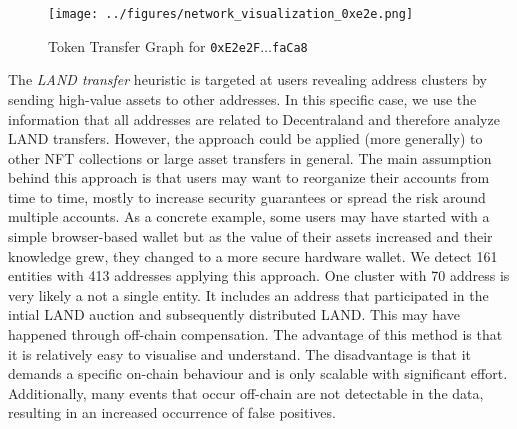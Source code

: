 \documentclass[12pt,a4paper,titlepage,oneside,english]{article}
\begin{document}
\begin{figure}[h!]
	\centering
	\texttt{[image: ../figures/network\_visualization\_0xe2e.png]}
	\caption{Token Transfer Graph for \texttt{0xE2e2F$\dots$faCa8}}
	\label{fig:cluster}
\end{figure}

The \textit{LAND transfer} heuristic is targeted at users revealing address clusters by sending high-value assets to other addresses. In this specific case, we use the information that all addresses are related to Decentraland and therefore analyze LAND transfers. However, the approach could be applied (more generally) to other NFT collections or large asset transfers in general. \newline
The main assumption behind this approach is that users may want to reorganize their accounts from time to time, mostly to increase security guarantees or spread the risk around multiple accounts. As a concrete example, some users may have started with a simple browser-based wallet but as the value of their assets increased and their knowledge grew, they changed to a more secure hardware wallet. We detect 161 entities with 413 addresses applying this approach. One cluster with 70 address is very likely a not a single entity. It includes an address that participated in the intial LAND auction and subsequently distributed LAND. This may have happened through off-chain compensation. The advantage of this method is that it is relatively easy to visualise and understand. The disadvantage is that it demands a specific on-chain behaviour and is only scalable with significant effort. Additionally, many events that occur off-chain are not detectable in the data, resulting in an increased occurrence of false positives. 
\end{document}
